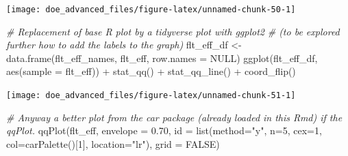 \documentclass[
]{book}
\newenvironment{Shaded}{\begin{snugshade}}{\end{snugshade}}
\newcommand{\AttributeTok}[1]{\textcolor[rgb]{0.77,0.63,0.00}{#1}}
\newcommand{\CommentTok}[1]{\textcolor[rgb]{0.56,0.35,0.01}{\textit{#1}}}
\newcommand{\ConstantTok}[1]{\textcolor[rgb]{0.00,0.00,0.00}{#1}}
\newcommand{\DecValTok}[1]{\textcolor[rgb]{0.00,0.00,0.81}{#1}}
\newcommand{\FloatTok}[1]{\textcolor[rgb]{0.00,0.00,0.81}{#1}}
\newcommand{\FunctionTok}[1]{\textcolor[rgb]{0.00,0.00,0.00}{#1}}
\newcommand{\NormalTok}[1]{#1}
\newcommand{\OtherTok}[1]{\textcolor[rgb]{0.56,0.35,0.01}{#1}}
\newcommand{\SpecialCharTok}[1]{\textcolor[rgb]{0.00,0.00,0.00}{#1}}
\newcommand{\StringTok}[1]{\textcolor[rgb]{0.31,0.60,0.02}{#1}}
\begin{document}
\begin{Shaded}
\end{Shaded}

\texttt{[image: doe\_advanced\_files/figure-latex/unnamed-chunk-50-1]}

\begin{Shaded}
\begin{Highlighting}[]
\CommentTok{\# Replacement of base R plot by a tidyverse plot with ggplot2}
\CommentTok{\# (to be explored further how to add the labels to the graph)}
\NormalTok{flt\_eff\_df }\OtherTok{\textless{}{-}} \FunctionTok{data.frame}\NormalTok{(flt\_eff\_names, flt\_eff, }\AttributeTok{row.names =} \ConstantTok{NULL}\NormalTok{)}
\FunctionTok{ggplot}\NormalTok{(flt\_eff\_df, }\FunctionTok{aes}\NormalTok{(}\AttributeTok{sample =}\NormalTok{ flt\_eff)) }\SpecialCharTok{+} 
    \FunctionTok{stat\_qq}\NormalTok{() }\SpecialCharTok{+}
    \FunctionTok{stat\_qq\_line}\NormalTok{() }\SpecialCharTok{+}
    \FunctionTok{coord\_flip}\NormalTok{()}
\end{Highlighting}
\end{Shaded}

\texttt{[image: doe\_advanced\_files/figure-latex/unnamed-chunk-51-1]}

\begin{Shaded}
\begin{Highlighting}[]
\CommentTok{\# Anyway a better plot from the car package (already loaded in this Rmd) if the qqPlot.}
\FunctionTok{qqPlot}\NormalTok{(flt\_eff, }\AttributeTok{envelope =} \FloatTok{0.70}\NormalTok{, }
       \AttributeTok{id =} \FunctionTok{list}\NormalTok{(}\AttributeTok{method=}\StringTok{"y"}\NormalTok{, }\AttributeTok{n=}\DecValTok{5}\NormalTok{, }\AttributeTok{cex=}\DecValTok{1}\NormalTok{, }\AttributeTok{col=}\FunctionTok{carPalette}\NormalTok{()[}\DecValTok{1}\NormalTok{], }\AttributeTok{location=}\StringTok{"lr"}\NormalTok{), }
       \AttributeTok{grid =} \ConstantTok{FALSE}\NormalTok{)}
\end{Highlighting}
\end{Shaded}
\end{document}
